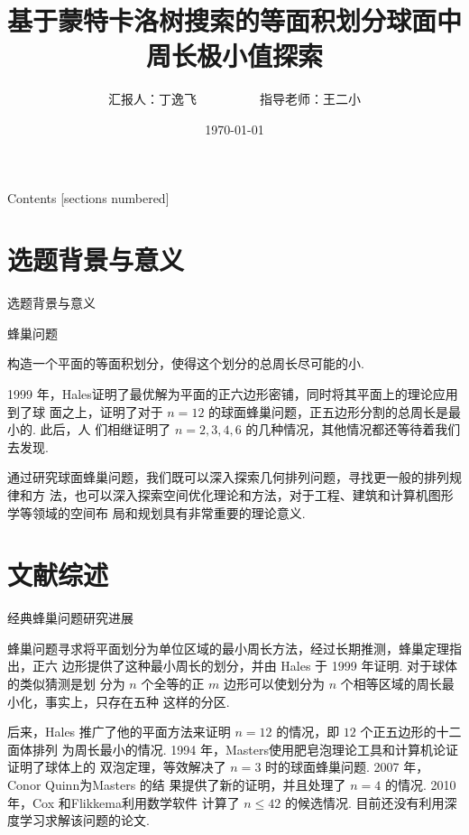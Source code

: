 \documentclass[12pt,aspectratio=169]{beamer}
\title{基于蒙特卡洛树搜索的等面积划分球面中周长极小值探索}
\date{\today}
\author{汇报人：丁逸飞\ \ \ \ \ \ \ \ \ \ 指导老师：王二小}
\begin{document}
\maketitle
\footnotesize
\begin{frame}{Contents}
  [sections numbered]
  \tableofcontents%
\end{frame}

\section{选题背景与意义}

\begin{frame}{选题背景与意义}

  \begin{block}{蜂巢问题}

    构造一个平面的等面积划分，使得这个划分的总周长尽可能的小. 

  \end{block}

  1999 年，Hales\cite{hales2001honeycomb}证明了最优解为平面的正六边形密铺，同时将其平面上的理论应用到了球
  面之上，证明了对于 $n = 12$ 的球面蜂巢问题，正五边形分割的总周长是最小的. 此后，人
  们相继证明了 $n = 2, 3, 4, 6$ 的几种情况，其他情况都还等待着我们去发现. 

  通过研究球面蜂巢问题，我们既可以深入探索几何排列问题，寻找更一般的排列规律和方
  法，也可以深入探索空间优化理论和方法，对于工程、建筑和计算机图形学等领域的空间布
  局和规划具有非常重要的理论意义. 

\end{frame}

\section{文献综述}

\begin{frame}{经典蜂巢问题研究进展}

  蜂巢问题寻求将平面划分为单位区域的最小周长方法，经过长期推测，蜂巢定理指出，正六
  边形提供了这种最小周长的划分，并由 Hales 于 1999 年证明\cite{hales2001honeycomb}. 对于球体的类似猜测是划
  分为 $n$ 个全等的正 $m$ 边形可以使划分为 $n$ 个相等区域的周长最小化，事实上，只存在五种
  这样的分区. 

  后来，Hales 推广了他的平面方法来证明 $n = 12$ 的情况，即 $12$ 个正五边形的十二面体排列
  为周长最小的情况. 1994 年，Masters\cite{masters1996perimeter}使用肥皂泡理论工具和计算机论证证明了球体上的
  双泡定理，等效解决了 $n = 3$ 时的球面蜂巢问题. 2007 年，Conor Quinn\cite{quinn2007least}为Masters 的结
  果提供了新的证明，并且处理了 $n = 4$ 的情况. 2010 年，Cox 和Flikkema\cite{cox2010minimal}利用数学软件
  计算了 $n \leq 42$ 的候选情况. 目前还没有利用深度学习求解该问题的论文. 

\end{frame}
\end{document}
